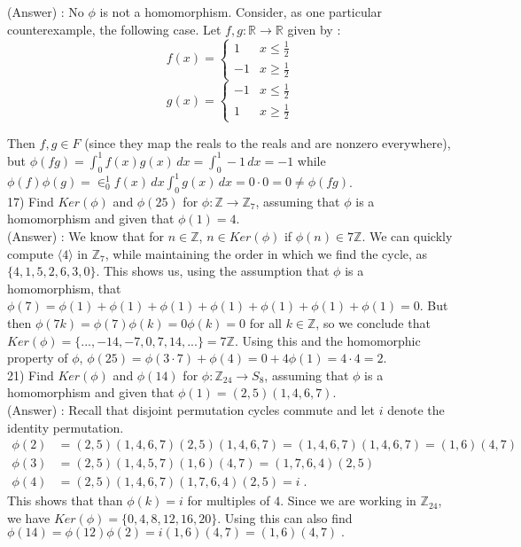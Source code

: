 \documentclass[12pt, letterpaper]{article}
\begin{document}
(Answer) : No $\phi$ is not a homomorphism. Consider, as one particular counterexample, the following case. Let $f,g : \mathbb{R} \rightarrow \mathbb{R}$ given by : 
\[ f(x) = \begin{cases}
      1 & x\leq \frac{1}{2} \\
      -1 & x\geq \frac{1}{2}
   \end{cases}
\]
\[ g(x) = \begin{cases}
      -1 & x\leq \frac{1}{2} \\
      1 & x\geq \frac{1}{2}
   \end{cases}
\]

Then $f,g \in F$ (since they map the reals to the reals and are nonzero everywhere), but $\phi(fg) = \int_0^1 f(x)g(x) \, dx = \int_0^1 -1 \, dx = -1$ while $\phi(f)\phi(g) = \in_0^1 f(x) \, dx \int_0^1 g(x) \, dx = 0 \cdot 0 = 0 \neq \phi(fg)$.  \\

17) Find $Ker(\phi)$ and $\phi(25)$ for $\phi : \mathbb{Z} \rightarrow \mathbb{Z}_7$, assuming that $\phi$ is a homomorphism and given that $\phi(1) = 4$. \\

(Answer) : We know that for $n \in \mathbb{Z}$, $n \in Ker(\phi)$ if $\phi(n) \in 7\mathbb{Z}$. We can quickly compute $\langle 4 \rangle$ in $\mathbb{Z}_7$, while maintaining the order in which we find the cycle, as $\{4, 1, 5, 2, 6, 3, 0\}$. This shows us, using the assumption that $\phi$ is a homomorphism, that $\phi(7) = \phi(1)+\phi(1)+
\phi(1)+\phi(1)+\phi(1)+\phi(1)+\phi(1) = 0$. But then $\phi(7k) = \phi(7)\phi(k) = 0\phi(k) = 0$ for all $k \in \mathbb{Z}$, so we conclude that $Ker(\phi) = \{...,-14,-7,0,7,14,...\} = 7\mathbb{Z}$. Using this and the homomorphic property of $\phi$, $\phi(25) = \phi(3\cdot7) + \phi(4) = 0 + 4\phi(1) = 4 \cdot 4 = 2$. \\

21) Find $Ker(\phi)$ and $\phi(14)$ for $\phi : \mathbb{Z}_{24} \rightarrow S_8$, assuming that $\phi$ is a homomorphism and given that $\phi(1) = (2,5)(1,4,6,7)$. \\

(Answer) :  Recall that disjoint permutation cycles commute and let $i$ denote the identity permutation. 
\begin{align*}
\phi(2) &= (2,5)(1,4,6,7)(2,5)(1,4,6,7) = (1,4,6,7)(1,4,6,7) = (1,6)(4,7) \\
\phi(3) &=(2,5)(1,4,5,7)(1,6)(4,7) = (1,7,6,4)(2,5) \\
\phi(4) &= (2,5)(1,4,6,7)(1,7,6,4)(2,5) = i \;.
\end{align*}
This shows that than $\phi(k) = i$ for multiples of $4$. Since we are working in $\mathbb{Z}_{24}$, we have $Ker(\phi) = \{0,4,8,12,16,20\}$. Using this can also find $\phi(14) = \phi(12)\phi(2) = i(1,6)(4,7) = (1,6)(4,7)\;.$ \\
\end{document}
